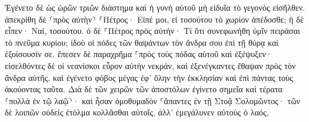 \documentclass{openreader}
\begin{document}
Ἐγένετο δὲ ὡς ὡρῶν τριῶν διάστημα καὶ ἡ γυνὴ αὐτοῦ μὴ εἰδυῖα τὸ γεγονὸς εἰσῆλθεν. 
ἀπεκρίθη δὲ ⸂πρὸς αὐτὴν⸃ ⸀Πέτρος· Εἰπέ μοι, εἰ τοσούτου τὸ χωρίον ἀπέδοσθε; ἡ δὲ εἶπεν· Ναί, τοσούτου. 
ὁ δὲ ⸀Πέτρος πρὸς αὐτήν· Τί ὅτι συνεφωνήθη ὑμῖν πειράσαι τὸ πνεῦμα κυρίου; ἰδοὺ οἱ πόδες τῶν θαψάντων τὸν ἄνδρα σου ἐπὶ τῇ θύρᾳ καὶ ἐξοίσουσίν σε. 
ἔπεσεν δὲ παραχρῆμα ⸀πρὸς τοὺς πόδας αὐτοῦ καὶ ἐξέψυξεν· εἰσελθόντες δὲ οἱ νεανίσκοι εὗρον αὐτὴν νεκράν, καὶ ἐξενέγκαντες ἔθαψαν πρὸς τὸν ἄνδρα αὐτῆς. 
καὶ ἐγένετο φόβος μέγας ἐφ’ ὅλην τὴν ἐκκλησίαν καὶ ἐπὶ πάντας τοὺς ἀκούοντας ταῦτα. 
Διὰ δὲ τῶν χειρῶν τῶν ἀποστόλων ἐγίνετο σημεῖα καὶ τέρατα ⸂πολλὰ ἐν τῷ λαῷ⸃· καὶ ἦσαν ὁμοθυμαδὸν ⸀ἅπαντες ἐν τῇ Στοᾷ Σολομῶντος· 
τῶν δὲ λοιπῶν οὐδεὶς ἐτόλμα κολλᾶσθαι αὐτοῖς, ἀλλ’ ἐμεγάλυνεν αὐτοὺς ὁ λαός, 
\end{document}
